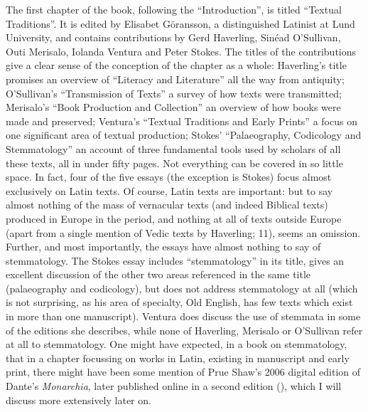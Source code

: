 \documentclass{article}
\begin{document}
The first chapter of the book, following the ``Introduction'',
is titled ``Textual Traditions''. It is edited by Elisabet Göransson, a
distinguished Latinist at Lund University, and contains contributions by
Gerd Haverling, Sinéad O'Sullivan, Outi Merisalo, Iolanda Ventura and
Peter Stokes. The titles of the contributions give a clear sense of the
conception of the chapter as a whole: Haverling's title promises an
overview of ``Literacy and Literature'' all the way from antiquity;
O'Sullivan's ``Transmission of Texts'' a survey of how texts were
transmitted; Merisalo's ``Book Production and Collection'' an overview
of how books were made and preserved; Ventura's ``Textual Traditions and
Early Prints'' a focus on one significant area of textual production;
Stokes' ``Palaeography, Codicology and Stemmatology'' an account of
three fundamental tools used by scholars of all these texts, all in
under fifty pages. Not everything can be covered in so little space. In
fact, four of the five essays (the exception is Stokes) focus almost
exclusively on Latin texts. Of course, Latin texts are important: but to
say almost nothing of the mass of vernacular texts (and indeed Biblical
texts) produced in Europe in the period, and nothing at all of texts
outside Europe (apart from a single mention of Vedic texts by Haverling;
11), seems an omission. Further, and most importantly, the essays have
almost nothing to say of stemmatology. The Stokes essay includes
``stemmatology'' in its title, gives an excellent discussion of the
other two areas referenced in the same title (palaeography and
codicology), but does not address stemmatology at all (which is not
surprising, as his area of specialty, Old English, has few texts which
exist in more than one manuscript). Ventura does discuss the use of
stemmata in some of the editions she describes, while none of Haverling,
Merisalo or O'Sullivan refer at all to stemmatology. One might have
expected, in a book on stemmatology, that in a chapter focussing on
works in Latin, existing in manuscript and early print, there might have
been some mention of Prue Shaw's 2006 digital edition of Dante's
\emph{Monarchia}, later published online in a second edition (\citeyear{alighieri_monarchia_2019}),
which I will discuss more extensively later on.
\end{document}
